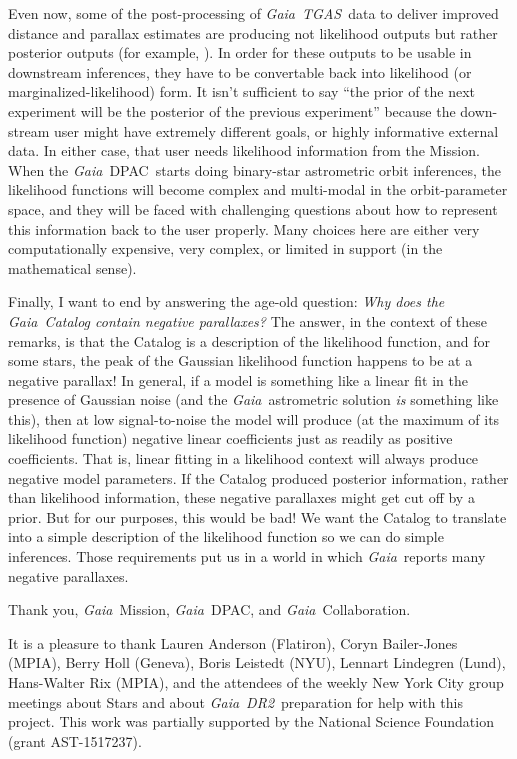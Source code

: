 \documentclass[12pt, modern]{aastex62h}
\newcommand{\acronym}[1]{{\small{#1}}}
\newcommand{\Gaia}{\textsl{Gaia}}
\newcommand{\DRtwo}{\textsl{\acronym{DR2}}}
\newcommand{\TGAS}{\textsl{\acronym{TGAS}}}
\newcommand{\DPAC}{{\acronym{DPAC}}}
\begin{document}
Even now, some of the post-processing of \Gaia\ \TGAS\ data to deliver
improved distance and parallax estimates are producing not likelihood outputs
but rather posterior outputs (for example, \citealt{tri3, leistedt, anderson}).
In order for these outputs to be usable in downstream inferences,
they have to be convertable back into likelihood (or marginalized-likelihood) form.
It isn't sufficient to say ``the prior of the next experiment will be the posterior
of the previous experiment'' because the down-stream user might have extremely
different goals, or highly informative external data. In either case, that user
needs likelihood information from the Mission.
When the \Gaia\ \DPAC\ starts doing binary-star astrometric orbit inferences, the likelihood
functions will become complex and multi-modal in the orbit-parameter space,
and they will be faced with challenging questions about how to represent this
information back to the user properly.
Many choices here are either very computationally expensive, very complex, or
limited in support (in the mathematical sense).

Finally, I want to end by answering the age-old question:
\emph{Why does the \Gaia\ Catalog contain negative parallaxes?}
The answer, in the context of these remarks, is that the Catalog
is a description of the likelihood function, and
for some stars, the peak of the Gaussian likelihood function happens
to be at a negative parallax!
In general, if a model is something like a linear fit in the presence of Gaussian
noise (and the \Gaia\ astrometric solution \emph{is} something like this), then
at low signal-to-noise the model will produce (at the maximum of its likelihood
function) negative linear coefficients just as readily as positive coefficients.
That is, linear fitting in a likelihood context will always produce negative
model parameters.
If the Catalog produced posterior information, rather than likelihood information,
these negative parallaxes might get cut off by a prior.
But for our purposes, this would be bad!
We want the Catalog to translate into a simple description
of the likelihood function so we can do simple inferences.
Those requirements put us in a world in which \Gaia\ reports many
negative parallaxes.

Thank you, \Gaia\ Mission, \Gaia\ \DPAC, and \Gaia\ Collaboration.

\acknowledgements
It is a pleasure to thank
  Lauren Anderson (Flatiron),
  Coryn Bailer-Jones (\acronym{MPIA}),
  Berry Holl (Geneva),
  Boris Leistedt (\acronym{NYU}),
  Lennart Lindegren (Lund),
  Hans-Walter Rix (\acronym{MPIA}),
and the attendees of the
  weekly New York City group meetings about Stars and about \Gaia\ \DRtwo\ preparation
for help with this project.
This work was partially supported by
  the National Science Foundation (grant \acronym{AST-1517237}).
\end{document}
